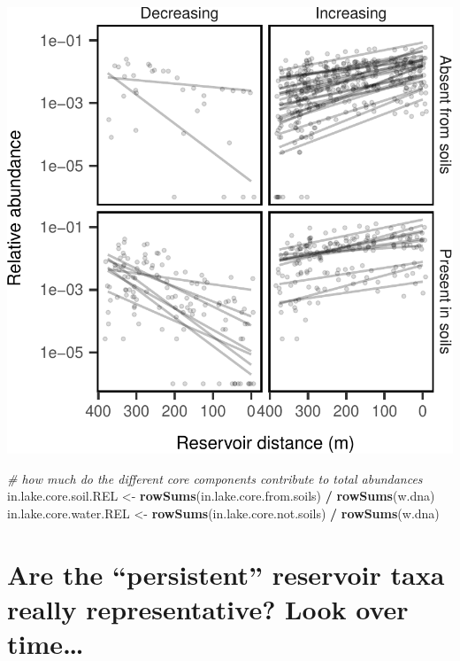 \documentclass[]{article}
\newenvironment{Shaded}{\begin{snugshade}}{\end{snugshade}}
\newcommand{\KeywordTok}[1]{\textcolor[rgb]{0.13,0.29,0.53}{\textbf{#1}}}
\newcommand{\StringTok}[1]{\textcolor[rgb]{0.31,0.60,0.02}{#1}}
\newcommand{\CommentTok}[1]{\textcolor[rgb]{0.56,0.35,0.01}{\textit{#1}}}
\newcommand{\OperatorTok}[1]{\textcolor[rgb]{0.81,0.36,0.00}{\textbf{#1}}}
\newcommand{\NormalTok}[1]{#1}
\begin{document}
\begin{center}\includegraphics{ReservoirGradient_files/figure-latex/sig_taxa-1} \end{center}

\begin{Shaded}
\begin{Highlighting}[]
\CommentTok{# how much do the different core components contribute to total abundances}
\NormalTok{in.lake.core.soil.REL <-}\StringTok{ }\KeywordTok{rowSums}\NormalTok{(in.lake.core.from.soils) }\OperatorTok{/}\StringTok{ }\KeywordTok{rowSums}\NormalTok{(w.dna)}
\NormalTok{in.lake.core.water.REL <-}\StringTok{ }\KeywordTok{rowSums}\NormalTok{(in.lake.core.not.soils) }\OperatorTok{/}\StringTok{ }\KeywordTok{rowSums}\NormalTok{(w.dna)}
\end{Highlighting}
\end{Shaded}

\section{\texorpdfstring{Are the ``persistent'' reservoir taxa really
representative? Look over
time\ldots{}}{Are the persistent reservoir taxa really representative? Look over time\ldots{}}}\label{are-the-persistent-reservoir-taxa-really-representative-look-over-time}
\end{document}
